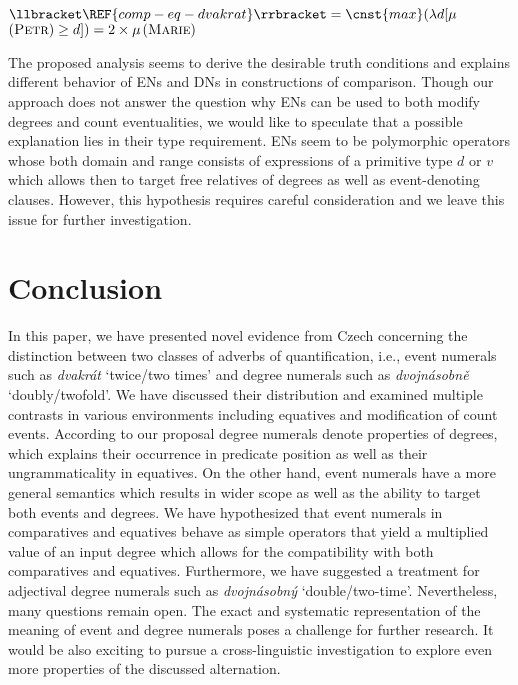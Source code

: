 \documentclass[output=paper,
modfonts,
hidelinks,
newtxmath
]{langscibook}
\begin{document}
\ea $\llbracket \REF{comp-eq-dvakrat}\rrbracket = \cnst{max}(\lambda d[\mu$$(\textsc{Petr})\geq d]) = 2 \times \mu$$(\textsc{Marie})$\label{eq-dvakrat-int}
\z

\noindent The proposed analysis seems to derive the desirable truth conditions and explains different behavior of ENs and DNs in constructions of comparison. Though our approach does not answer the question why ENs can be used to both modify degrees and count eventualities, we would like to speculate that a possible explanation lies in their type requirement. ENs seem to be polymorphic operators whose both domain and range consists of expressions of a primitive type $d$ or $v$ which allows then to target free relatives of degrees as well as event-denoting clauses. However, this hypothesis requires careful consideration and we leave this issue for further investigation. 

\section{Conclusion}\label{conclusion}

In this paper, we have presented novel evidence from Czech concerning the distinction between two classes of adverbs of quantification, i.e., event numerals such as \textit{dvakrát} `twice/two times' and degree numerals such as \textit{dvojnásobně} `doubly/twofold'. We have discussed their distribution and examined multiple contrasts in various environments including equatives and modification of count events. According to our proposal degree numerals denote properties of degrees, which explains their occurrence in predicate position as well as their ungrammaticality in equatives. On the other hand, event numerals have a more general semantics which results in wider scope as well as the ability to target both events and degrees. We have hypothesized that event numerals in comparatives and equatives behave as simple operators that yield a multiplied value of an input degree which allows for the compatibility with both comparatives and equatives. Furthermore, we have suggested a treatment for adjectival degree numerals such as \textit{dvojnásobný} `double/two-time'. Nevertheless, many questions remain open. The exact and systematic representation of the meaning of event and degree numerals poses a challenge for further research. It would be also exciting to pursue a cross-linguistic investigation to explore even more properties of the discussed alternation.
\end{document}
